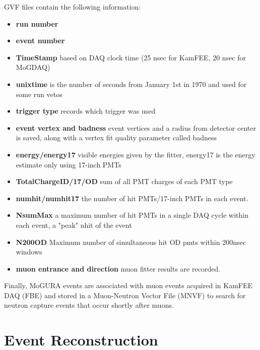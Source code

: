 GVF files contain the following information:
\begin{itemize}
	\item \textbf{run number}
	\item \textbf{event number}
	\item \textbf{TimeStamp} based on DAQ clock time (25 nsec for KamFEE, 20 nsec for MoGDAQ)
	\item \textbf{unixtime} is the number of seconds from January 1st in 1970 and used for some run vetos
	\item \textbf{trigger type} records which trigger was used
	\item \textbf{event vertex and badness} event vertices and a radius from detector center is saved, along with a vertex fit quality parameter called badness 
	\item \textbf{energy/energy17} visible energies given by the fitter, energy17 is the energy estimate only using 17-inch PMTs
	\item \textbf{TotalChargeID/17/OD} sum of all PMT charges of each PMT type
	\item \textbf{numhit/numhit17} the number of hit PMTs/17-inch PMTs in each event.
	\item \textbf{NsumMax} a maximum number of hit PMTs in a single DAQ cycle within each event, a "peak" nhit of the event
	\item \textbf{N200OD} Maximum number of simultaneous hit OD pmts within 200nsec windows
	\item \textbf{muon entrance and direction} muon fitter results are recorded.
\end{itemize}

Finally, MoGURA events are associated with muon events acquired in KamFEE DAQ (FBE) and stored in a Muon-Neutron Vector File (MNVF) to search for neutron capture events that occur shortly after muons.

\section{Event Reconstruction}
